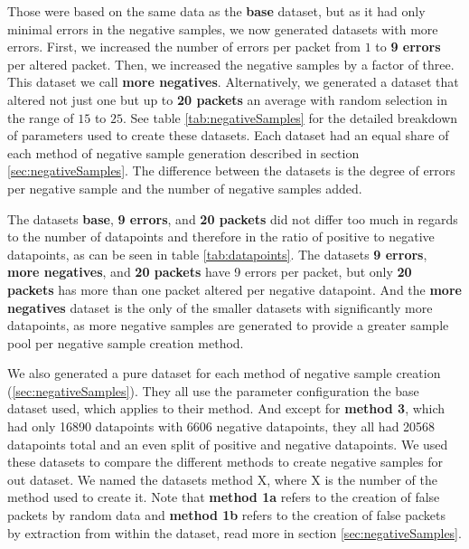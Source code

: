 \documentclass[
	ngerman,
	ruledheaders=section,%
	class=report,%
	thesis={type=bachelor},%
	accentcolor=9c,%
	custommargins=true,%
	marginpar=false,%
	parskip=half-,%
	fontsize=11pt,%
	twoside
]{tudapub}
\begin{document}
Those were based on the same data as the \textbf{base} dataset, but as it had only minimal errors in the negative samples, we now generated datasets with more errors.
First, we increased the number of errors per packet from $1$ to \textbf{9 errors} per altered packet.
Then, we increased the negative samples by a factor of three. This dataset we call \textbf{more negatives}.
Alternatively, we generated a dataset that altered not just one but up to \textbf{20 packets} an average with random selection in the range of $15$ to $25$.
See table \ref{tab:negativeSamples} for the detailed breakdown of parameters used to create these datasets.
Each dataset had an equal share of each method of negative sample generation described in section \ref{sec:negativeSamples}.
The difference between the datasets is the degree of errors per negative sample and the number of negative samples added.

The datasets \textbf{base}, \textbf{9 errors}, and \textbf{20 packets} did not differ too much in regards to the number of datapoints and therefore in the ratio of positive to negative datapoints, as can be seen in table \ref{tab:datapoints}.
The datasets \textbf{9 errors}, \textbf{more negatives}, and \textbf{20 packets} have 9 errors per packet, but only \textbf{20 packets} has more than one packet altered per negative datapoint.
And the \textbf{more negatives} dataset is the only of the smaller datasets with significantly more datapoints, as more negative samples are generated to provide a greater sample pool per negative sample creation method.

We also generated a pure dataset for each method of negative sample creation (\ref{sec:negativeSamples}).
They all use the parameter configuration the base dataset used, which applies to their method.
And except for \textbf{method 3}, which had only 16890 datapoints with 6606 negative datapoints, they all had 20568 datapoints total and an even split of positive and negative datapoints.
We used these datasets to compare the different methods to create negative samples for out dataset.
We named the datasets method X, where X is the number of the method used to create it.
Note that \textbf{method 1a} refers to the creation of false packets by random data and \textbf{method 1b} refers to the creation of false packets by extraction from within the dataset, read more in section \ref{sec:negativeSamples}.

\end{document}

